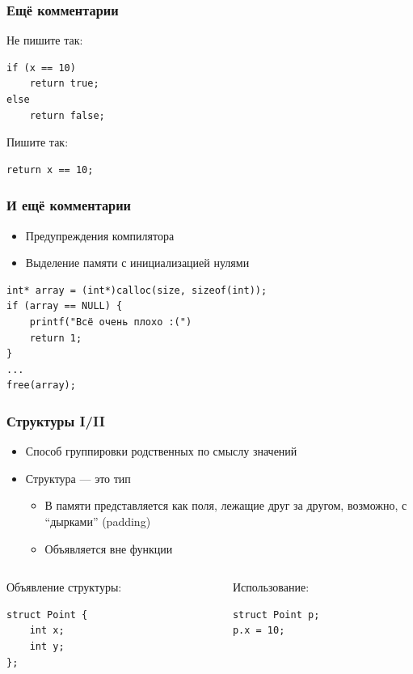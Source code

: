 \documentclass[aspectratio=169]{beamer}
\begin{document}
\begin{frame}[fragile]
    \frametitle{Ещё комментарии}
    Не пишите так:
    \begin{verbatim}
if (x == 10)
    return true;
else
    return false;
        \end{verbatim}
    Пишите так:
    \begin{verbatim}
return x == 10;
        \end{verbatim}
\end{frame}

\begin{frame}[fragile]
    \frametitle{И ещё комментарии}
    \begin{itemize}
        \item Предупреждения компилятора
        \item Выделение памяти с инициализацией нулями
    \end{itemize}
    \begin{verbatim}
int* array = (int*)calloc(size, sizeof(int));
if (array == NULL) {
    printf("Всё очень плохо :(")
    return 1;
}
...
free(array);
        \end{verbatim}
\end{frame}

\begin{frame}[fragile]
    \frametitle{Структуры I/II}
    \begin{itemize}
        \item Способ группировки родственных по смыслу значений
        \item Структура --- это тип
              \begin{itemize}
                  \item В памяти представляется как поля, лежащие друг за другом, возможно, с \enquote{дырками} (padding)
                  \item Объявляется вне функции
              \end{itemize}
    \end{itemize}
    \begin{columns}[t]
        \begin{column}{0.45\linewidth}
            Объявление структуры:
            \begin{verbatim}
struct Point {
    int x;
    int y;
};
            \end{verbatim}
        \end{column}
        \begin{column}{0.45\linewidth}
            Использование:
            \begin{verbatim}
struct Point p;
p.x = 10;
            \end{verbatim}
        \end{column}
    \end{columns}
\end{frame}
\end{document}
